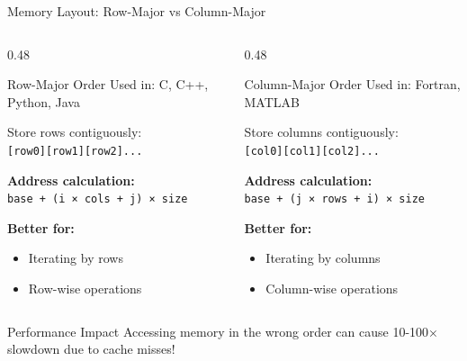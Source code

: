 \documentclass[aspectratio=169,xcolor=dvipsnames]{beamer}
\begin{document}
\begin{frame}{Memory Layout: Row-Major vs Column-Major}
  \begin{columns}
    \begin{column}{0.48\textwidth}
      \begin{block}{Row-Major Order}
        Used in: C, C++, Python, Java

        \vspace{0.2cm}

        Store rows contiguously: \\
        \texttt{[row0][row1][row2]...}

        \vspace{0.2cm}

        \textbf{Address calculation:} \\
        \texttt{base + (i × cols + j) × size}

        \vspace{0.2cm}

        \textbf{Better for:}
        \begin{itemize}
          \item Iterating by rows
          \item Row-wise operations
        \end{itemize}
      \end{block}
    \end{column}
    \begin{column}{0.48\textwidth}
      \begin{block}{Column-Major Order}
        Used in: Fortran, MATLAB

        \vspace{0.2cm}

        Store columns contiguously: \\
        \texttt{[col0][col1][col2]...}

        \vspace{0.2cm}

        \textbf{Address calculation:} \\
        \texttt{base + (j × rows + i) × size}

        \vspace{0.2cm}

        \textbf{Better for:}
        \begin{itemize}
          \item Iterating by columns
          \item Column-wise operations
        \end{itemize}
      \end{block}
    \end{column}
  \end{columns}

  \vspace{0.3cm}

  \begin{alertblock}{Performance Impact}
    Accessing memory in the wrong order can cause 10-100× slowdown due to cache misses!
  \end{alertblock}
\end{frame}
\end{document}
